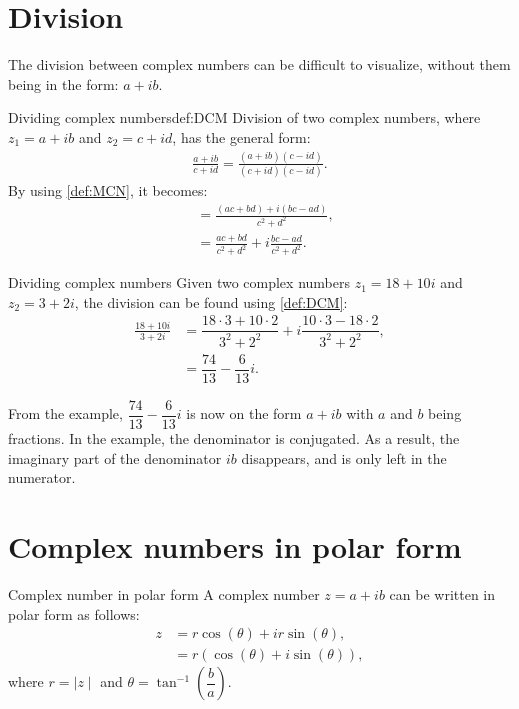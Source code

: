 \section{Division}
The division between complex numbers can be difficult to visualize, without them being in the form: $a + ib$. 
\begin{definition}{Dividing complex numbers}{def:DCM}
Division of two complex numbers, where $z_1=a+ib$ and $z_2=c+id$, has the general form:
\begin{align*}
\frac{a + ib}{c + id} = \frac{(a+ib)(c-id)}{(c+id)(c-id)}.
\end{align*}
By using \cref{def:MCN}, it becomes:  
\begin{align*}
&= \frac{(ac+bd)+i(bc-ad)}{c^2+d^2},							\\[1em]
&= \frac{ac+bd}{c^2+d^2}+i \frac{bc-ad}{c^2+d^2}.				
\end{align*}
\end{definition}
\begin{example}{Dividing complex numbers}{}
Given two complex numbers $z_1=18+10i$ and $z_2=3+2i$, the division can be found using \cref{def:DCM}:
\begin{align*}
\frac{18 + 10i}{3 + 2i} &= \dfrac{18\cdot3+10\cdot2}{3^2+2^2}+i\dfrac{10\cdot3-18\cdot2}{3^2+2^2},
\\
&=\dfrac{74}{13}-\dfrac{6}{13}i.
\end{align*}
\end{example}


\noindent From the example, $\dfrac{74}{13} - \dfrac{6}{13}i$ is now on the form $a+ib$ with $a$ and $b$ being fractions. In the example, the denominator is conjugated. As a result, the imaginary part of the denominator $ib$ disappears, and is only left in the numerator. 


\section{Complex numbers in polar form}

\begin{definition}{Complex number in polar form}{}
A complex number $z=a+ib$ can be written in polar form as follows:
\begin{align*}
z&=r\cos(\theta)+ir\sin(\theta),
\\
&=r\left(\cos(\theta)+i\sin(\theta)\right),
\end{align*}
where $r=\mid z \mid$ and $\theta=\tan^{-1}\left(\dfrac{b}{a} \right).$
\end{definition}

